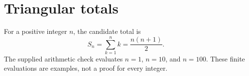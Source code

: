 \documentclass{article}
\begin{document}
\section{Triangular totals}
For a positive integer $n$, the candidate total is
\begin{equation}
S_n = \sum_{k=1}^{n} k = \frac{n(n+1)}{2}.
\label{eq:triangular-total}
\end{equation}
The supplied arithmetic check evaluates $n=1$, $n=10$, and $n=100$.
These finite evaluations are examples, not a proof for every integer.
\end{document}
